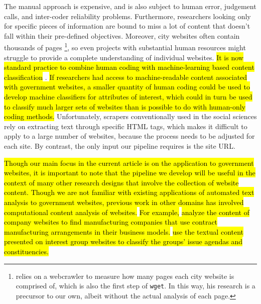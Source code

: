 \documentclass[11pt]{article}
\begin{document}
The manual approach is expensive, and is also subject to human error, judgement calls, and inter-coder reliability problems. Furthermore, researchers looking only for specific pieces of information are bound to miss a lot of content that doesn't fall within their pre-defined objectives. Moreover, city websites often contain thousands of pages \citep{Urban2002}\footnote{\cite{Urban2002} relies on a webcrawler to measure how many pages each city website is comprised of, which is also the first step of \texttt{wget}. In this way, his research is a precursor to our own, albeit without the actual analysis of each page.}, so even projects with substantial human resources might struggle to provide a complete understanding of individual websites. \hl{It is now standard practice to combine human coding with machine-learning based content classification} \citep[e.g., ][]{sebHok2021multiclass,fowler2021political}. \hl{If researchers had access to machine-readable content associated with government websites, a smaller quantity of human coding could be used to develop machine classifiers for attributes of interest, which could in turn be used to classify much larger sets of websites than is possible to do with human-only coding methods.} Unfortunately, scrapers conventionally used in the social sciences \citep[e.g.,][]{cryer2019navigating} rely on extracting text through specific HTML tags, which makes it difficult to apply to a large number of websites, because the process needs to be adjusted for each site. By contrast, the only input our pipeline requires is the site URL. 

\hl{Though our main focus in the current article is on the application to government websites, it is important to note that the pipeline we develop will be useful in the context of many other research designs that involve the collection of website content. Though we are not familiar with existing applications of automated text analysis to government websites, previous work in other domains has involved computational content analysis of websites.} \hl{For example, }\citet{coyle2020no} \hl{analyze the content of company websites to find manufacturing companies that use contract manufacturing arrangements in their business models.} \citet{kluver2015measuring} \hl{use the textual content presented on interest group websites to classify the groups' issue agendas and constituencies.}


\end{document}
